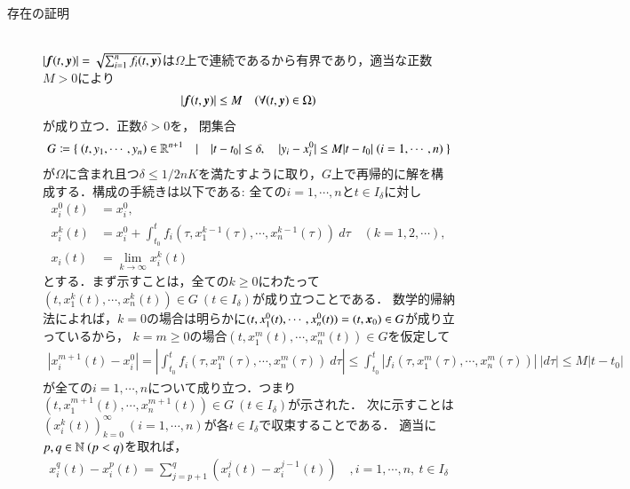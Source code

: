 	\begin{prf}\mbox{}\\
	\begin{description}
		\item[存在の証明]\mbox{}\\
			$|\mbox{\boldmath $f$}(t,\mbox{\boldmath $y$})| = \sqrt{\sum_{i=1}^{n} f_i(t,\mbox{\boldmath $y$})}$は$\Omega$上で連続であるから有界であり，適当な正数$M > 0$により
			\begin{align}
				|\mbox{\boldmath $f$}(t,\mbox{\boldmath $y$})| \leq M \quad (\forall (t,\mbox{\boldmath $y$}) \in \Omega)
			\end{align}
			が成り立つ．正数$\delta > 0$を，
			閉集合
			\begin{align}
				G \coloneqq \{\ (t,y_1,\cdots,y_n) \in \R^{n+1}\quad |\quad |t - t_0| \leq \delta,\quad |y_i - x_i^0| \leq M|t - t_0|\ (i=1,\cdots,n)\ \}
			\end{align}
			が$\Omega$に含まれ且つ$\delta \leq 1/2nK$を満たすように取り，$G$上で再帰的に解を構成する．構成の手続きは以下である:
			全ての$i = 1,\cdots,n$と$t \in I_\delta$に対し
			\begin{align}
				x_i^0(t) &= x_i^0, \\
				x_i^k(t) &= x_i^0 + \int_{t_0}^t f_i(\tau,x_1^{k-1}(\tau),\cdots,x_n^{k-1}(\tau))\ d\tau \quad (k = 1,2,\cdots), \\
				x_i(t) &= \lim_{k \to \infty} x_i^k(t)
			\end{align}
			とする．まず示すことは，全ての$k \geq 0$にわたって$(t, x_1^k(t), \cdots, x_n^k(t)) \in G\ (t \in I_\delta)$が成り立つことである．
			数学的帰納法によれば，$k=0$の場合は明らかに$(t, x_1^0(t), \cdots, x_n^0(t)) = (t, \mbox{\boldmath $x$}_0) \in G$が成り立っているから，
			$k=m \geq 0$の場合$(t, x_1^m(t), \cdots, x_n^m(t)) \in G$を仮定して
			\begin{align}
				|x_i^{m+1}(t) - x_i^0| = \left| \int_{t_0}^t f_i(\tau,x_1^m(\tau),\cdots,x_n^m(\tau))\ d\tau \right|
					\leq \int_{t_0}^t |f_i(\tau,x_1^m(\tau),\cdots,x_n^m(\tau))|\ |d\tau| \leq M|t - t_0|
			\end{align}
			が全ての$i = 1,\cdots,n$について成り立つ．つまり$(t, x_1^{m+1}(t), \cdots, x_n^{m+1}(t)) \in G\ (t \in I_\delta)$が示された．
			次に示すことは$\left(x_i^k(t)\right)_{k = 0}^{\infty} \ (i=1,\cdots,n)$が各$t \in I_\delta$で収束することである．
			適当に$p,q \in \mathbb{N}\ (p < q)$を取れば，
			\begin{align}
				x_i^q(t) - x_i^p(t) = \sum_{j=p+1}^{q}(x_i^j(t) - x_i^{j-1}(t)) \quad, i=1,\cdots,n,\ t \in I_\delta \label{eq:diff_eq_2}
			\end{align}

\end{description}
\end{prf}
